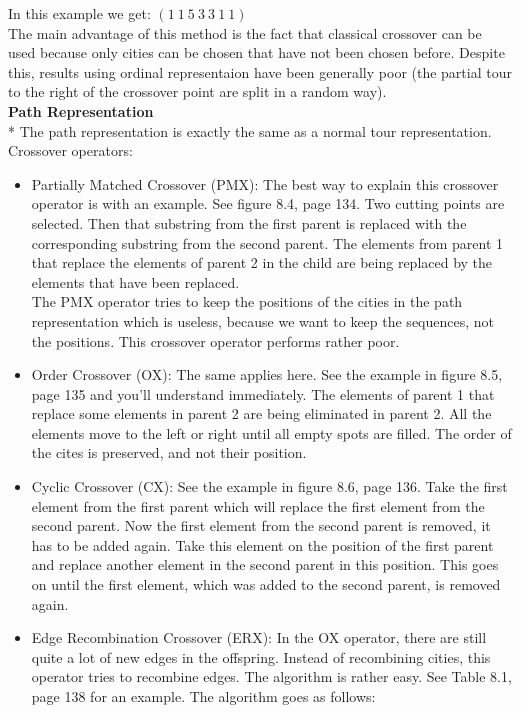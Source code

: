 \documentclass[12pt]{article}
\newcommand{\mysubparagraph}[1]{\textbf{#1}\mbox{}\\*}
\begin{document}
In this example we get: $(1\ 1\ 5\ 3\ 3\ 1\ 1)$\\
The main advantage of this method is the fact that classical crossover can be used because only cities can be chosen that have not been chosen before. Despite this, results using ordinal representaion have been generally poor (the partial tour to the right of the crossover point are split in a random way).\\
\mysubparagraph{Path Representation}
The path representation is exactly the same as a normal tour representation. Crossover operators:
\begin{itemize}
\item Partially Matched Crossover (PMX): The best way to explain this crossover operator is with an example. See figure 8.4, page 134. Two cutting points are selected. Then that substring from the first parent is replaced with the corresponding substring from the second parent. The elements from parent 1 that replace the elements of parent 2 in the child are being replaced by the elements that have been replaced.\\
The PMX operator tries to keep the positions of the cities in the path representation which is useless, because we want to keep the sequences, not the positions. This crossover operator performs rather poor.
\item Order Crossover (OX): The same applies here. See the example in figure 8.5, page 135 and you'll understand immediately. The elements of parent 1 that replace some elements in parent 2 are being eliminated in parent 2. All the elements move to the left or right until all empty spots are filled. The order of the cites is preserved, and not their position.
\item Cyclic Crossover (CX): See the example in figure 8.6, page 136. Take the first element from the first parent which will replace the first element from the second parent. Now the first element from the second parent is removed, it has to be added again. Take this element on the position of the first parent and replace another element in the second parent in this position. This goes on until the first element, which was added to the second parent, is removed again.
\item Edge Recombination Crossover (ERX): In the OX operator, there are still quite a lot of new edges in the offspring. Instead of recombining cities, this operator tries to recombine edges. The algorithm is rather easy. See Table 8.1, page 138 for an example. The algorithm goes as follows:
\begin{itemize}

\end{itemize}
\end{itemize}
\end{document}
